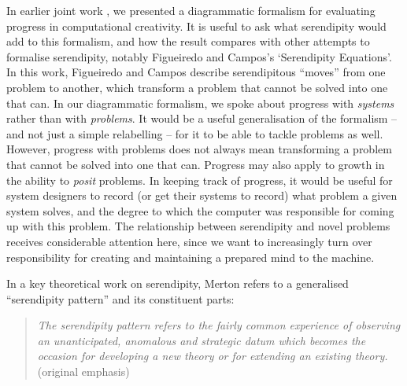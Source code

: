 In earlier joint work \cite{colton-assessingprogress}, we presented a
diagrammatic formalism for evaluating progress in computational
creativity.  It is useful to ask what serendipity would add to this
formalism, and how the result compares with other attempts to
formalise serendipity, notably Figueiredo and Campos's
\citeyear{Figueiredo2001} `Serendipity Equations'.  In this work,
Figueiredo and Campos describe serendipitous ``moves'' from one
problem to another, which transform a problem that cannot be solved
into one that can.  In our diagrammatic formalism, we spoke about
progress with \emph{systems} rather than with \emph{problems}.  It
would be a useful generalisation of the formalism -- and not just a
simple relabelling -- for it to be able to tackle problems as well.
However, progress with problems does not always mean transforming a
problem that cannot be solved into one that can.  Progress may also
apply to growth in the ability to \emph{posit} problems.  In keeping
track of progress, it would be useful for system designers to record
(or get their systems to record) what problem a given system solves,
and the degree to which the computer was responsible for coming up
with this problem.  The relationship between serendipity and novel
problems receives considerable attention here, since we want to
increasingly turn over responsibility for creating and maintaining a
prepared mind to the machine.

In a key theoretical work on serendipity, Merton \citeyear{merton1948bearing} \cite<cited in>[pp. 195--196]{merton} refers to a generalised ``serendipity pattern''
and its constituent parts:

\begin{quote}
\emph{The serendipity pattern refers to the fairly common experience of observing an \emph{unanticipated}, \emph{anomalous} \emph{and strategic} datum which becomes the occasion for developing a new theory or for extending an existing theory.}~\cite[p. 506]{merton1948bearing} (original emphasis)
\end{quote}

